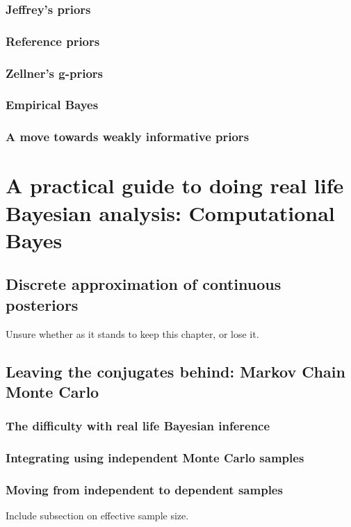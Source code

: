 \documentclass[11pt,fullpage]{book}
\begin{document}
\section{Jeffrey's priors}
\section{Reference priors}
\section{Zellner's g-priors}
\section{Empirical Bayes}
\section{A move towards weakly informative priors}



\part{A practical guide to doing real life Bayesian analysis: Computational Bayes}\label{part:computationalBayes}

\chapter{Discrete approximation of continuous posteriors}
Unsure whether as it stands to keep this chapter, or lose it.

\chapter{Leaving the conjugates behind: Markov Chain Monte Carlo}\label{chap:MCMC}

\section{The difficulty with real life Bayesian inference}
\section{Integrating using independent Monte Carlo samples}
\section{Moving from independent to dependent samples}
Include subsection on effective sample size.
\end{document}
